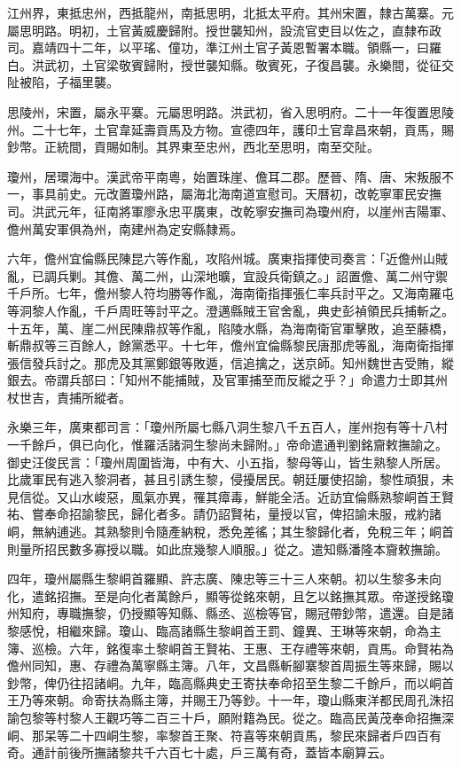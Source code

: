 \begin{pinyinscope}
江州界，東抵忠州，西抵龍州，南抵思明，北抵太平府。其州宋置，隸古萬寨。元屬思明路。明初，土官黃威慶歸附。授世襲知州，設流官吏目以佐之，直隸布政司。嘉靖四十二年，以平瑤、僮功，準江州土官子黃恩暫署本職。領縣一，曰羅白。洪武初，土官梁敬賓歸附，授世襲知縣。敬賓死，子復昌襲。永樂間，從征交阯被陷，子福里襲。

思陵州，宋置，屬永平寨。元屬思明路。洪武初，省入思明府。二十一年復置思陵州。二十七年，土官韋延壽貢馬及方物。宣德四年，護印土官韋昌來朝，貢馬，賜鈔幣。正統間，貢賜如制。其界東至忠州，西北至思明，南至交阯。

瓊州，居環海中。漢武帝平南粵，始置珠崖、儋耳二郡。歷晉、隋、唐、宋叛服不一，事具前史。元改置瓊州路，屬海北海南道宣慰司。天曆初，改乾寧軍民安撫司。洪武元年，征南將軍廖永忠平廣東，改乾寧安撫司為瓊州府，以崖州吉陽軍、儋州萬安軍俱為州，南建州為定安縣隸焉。

六年，儋州宜倫縣民陳昆六等作亂，攻陷州城。廣東指揮使司奏言：「近儋州山賊亂，已調兵剿。其儋、萬二州，山深地曠，宜設兵衛鎮之。」詔置儋、萬二州守禦千戶所。七年，儋州黎人符均勝等作亂，海南衛指揮張仁率兵討平之。又海南羅屯等洞黎人作亂，千戶周旺等討平之。澄邁縣賊王官舍亂，典史彭禎領民兵捕斬之。十五年，萬、崖二州民陳鼎叔等作亂，陷陵水縣，為海南衛官軍擊敗，追至藤橋，斬鼎叔等三百餘人，餘黨悉平。十七年，儋州宜倫縣黎民唐那虎等亂，海南衛指揮張信發兵討之。那虎及其黨鄭銀等敗遁，信追擒之，送京師。知州魏世吉受賄，縱銀去。帝謂兵部曰：「知州不能捕賊，及官軍捕至而反縱之乎？」命遣力士即其州杖世吉，責捕所縱者。

永樂三年，廣東都司言：「瓊州所屬七縣八洞生黎八千五百人，崖州抱有等十八村一千餘戶，俱已向化，惟羅活諸洞生黎尚未歸附。」帝命遣通判劉銘齎敕撫諭之。御史汪俊民言：「瓊州周圍皆海，中有大、小五指，黎母等山，皆生熟黎人所居。比歲軍民有逃入黎洞者，甚且引誘生黎，侵擾居民。朝廷屢使招諭，黎性頑狠，未見信從。又山水峻惡，風氣亦異，罹其瘴毒，鮮能全活。近訪宜倫縣熟黎峒首王賢祐、嘗奉命招諭黎民，歸化者多。請仍詔賢祐，量授以官，俾招諭未服，戒約諸峒，無納逋逃。其熟黎則令隨產納稅，悉免差徭；其生黎歸化者，免稅三年；峒首則量所招民數多寡授以職。如此庶幾黎人順服。」從之。遣知縣潘隆本齎敕撫諭。

四年，瓊州屬縣生黎峒首羅顯、許志廣、陳忠等三十三人來朝。初以生黎多未向化，遣銘招撫。至是向化者萬餘戶，顯等從銘來朝，且乞以銘撫其眾。帝遂授銘瓊州知府，專職撫黎，仍授顯等知縣、縣丞、巡檢等官，賜冠帶鈔幣，遣還。自是諸黎感悅，相繼來歸。瓊山、臨高諸縣生黎峒首王罰、鐘異、王琳等來朝，命為主簿、巡檢。六年，銘復率土黎峒首王賢祐、王惠、王存禮等來朝，貢馬。命賢祐為儋州同知，惠、存禮為萬寧縣主簿。八年，文昌縣斬腳寨黎首周振生等來歸，賜以鈔幣，俾仍往招諸峒。九年，臨高縣典史王寄扶奉命招至生黎二千餘戶，而以峒首王乃等來朝。命寄扶為縣主簿，并賜王乃等鈔。十一年，瓊山縣東洋都民周孔洙招諭包黎等村黎人王觀巧等二百三十戶，願附籍為民。從之。臨高民黃茂奉命招撫深峒、那呆等二十四峒生黎，率黎首王聚、符喜等來朝貢馬，黎民來歸者戶四百有奇。通計前後所撫諸黎共千六百七十處，戶三萬有奇，蓋皆本廟算云。


\end{pinyinscope}
